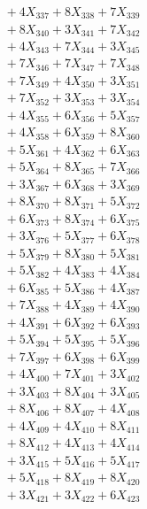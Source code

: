 \documentclass[a4paper,10pt]{article}
\begin{document}
{\begin{align}
&\;  + 4 X_{337} + 8 X_{338} + 7 X_{339} \\[0.5ex]\allowbreak
&\;  + 8 X_{340} + 3 X_{341} + 7 X_{342} \\[0.3ex]
&\;  + 4 X_{343} + 7 X_{344} + 3 X_{345} \\[0.3ex]
&\;  + 7 X_{346} + 7 X_{347} + 7 X_{348} \\[0.3ex]
&\;  + 7 X_{349} + 4 X_{350} + 3 X_{351} \\[0.3ex]
&\;  + 7 X_{352} + 3 X_{353} + 3 X_{354} \\[0.3ex]
&\;  + 4 X_{355} + 6 X_{356} + 5 X_{357} \\[0.3ex]
&\;  + 4 X_{358} + 6 X_{359} + 8 X_{360} \\[0.3ex]
&\;  + 5 X_{361} + 4 X_{362} + 6 X_{363} \\[0.3ex]
&\;  + 5 X_{364} + 8 X_{365} + 7 X_{366} \\[0.3ex]
&\;  + 3 X_{367} + 6 X_{368} + 3 X_{369} \\[0.5ex]\allowbreak
&\;  + 8 X_{370} + 8 X_{371} + 5 X_{372} \\[0.3ex]
&\;  + 6 X_{373} + 8 X_{374} + 6 X_{375} \\[0.3ex]
&\;  + 3 X_{376} + 5 X_{377} + 6 X_{378} \\[0.3ex]
&\;  + 5 X_{379} + 8 X_{380} + 5 X_{381} \\[0.3ex]
&\;  + 5 X_{382} + 4 X_{383} + 4 X_{384} \\[0.3ex]
&\;  + 6 X_{385} + 5 X_{386} + 4 X_{387} \\[0.3ex]
&\;  + 7 X_{388} + 4 X_{389} + 4 X_{390} \\[0.3ex]
&\;  + 4 X_{391} + 6 X_{392} + 6 X_{393} \\[0.3ex]
&\;  + 5 X_{394} + 5 X_{395} + 5 X_{396} \\[0.3ex]
&\;  + 7 X_{397} + 6 X_{398} + 6 X_{399} \\[0.5ex]\allowbreak
&\;  + 4 X_{400} + 7 X_{401} + 3 X_{402} \\[0.3ex]
&\;  + 3 X_{403} + 8 X_{404} + 3 X_{405} \\[0.3ex]
&\;  + 8 X_{406} + 8 X_{407} + 4 X_{408} \\[0.3ex]
&\;  + 4 X_{409} + 4 X_{410} + 8 X_{411} \\[0.3ex]
&\;  + 8 X_{412} + 4 X_{413} + 4 X_{414} \\[0.3ex]
&\;  + 3 X_{415} + 5 X_{416} + 5 X_{417} \\[0.3ex]
&\;  + 5 X_{418} + 8 X_{419} + 8 X_{420} \\[0.3ex]
&\;  + 3 X_{421} + 3 X_{422} + 6 X_{423} \\[0.3ex]

\end{align}}
\end{document}
